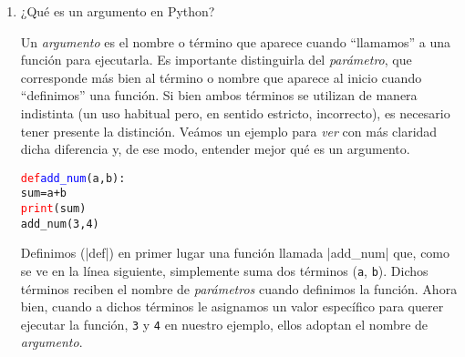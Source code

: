 \documentclass{article}
\begin{document}
\begin{enumerate}
\item ¿Qué es un argumento en Python?
\par \hspace{5pt} Un \emph{argumento} es el nombre o término que aparece cuando ``llamamos'' a una función para ejecutarla. Es importante distinguirla del \emph{parámetro}, que corresponde más bien al término o nombre que aparece al inicio cuando ``definimos'' una función. Si bien ambos términos se utilizan de manera indistinta (un uso habitual pero, en sentido estricto, incorrecto), es necesario tener presente la distinción. Veámos un ejemplo para \emph{ver} con más claridad dicha diferencia y, de ese modo, entender mejor qué es un argumento.
\begin{tcolorbox}
\begin{alltt}
\textcolor{red}{def} \textcolor{blue}{add_num}(a, b):
    sum = a + b
    \textcolor{red}{print}(sum)
add_num(3, 4) 
\end{alltt}        
\end{tcolorbox}
\par \hspace{5pt} Definimos (\rverb|def|) en primer lugar una función llamada \bverb|add_num| que, como se ve en la línea siguiente, simplemente suma dos términos (\verb|a|, \verb|b|). Dichos términos reciben el nombre de \emph{parámetros} cuando definimos la función. Ahora bien, cuando a dichos términos le asignamos un valor específico para querer ejecutar la función, \verb|3| y \verb|4| en nuestro ejemplo, ellos adoptan el nombre de \emph{argumento}. 
\vspace{0.5cm}


\end{enumerate}
\end{document}

